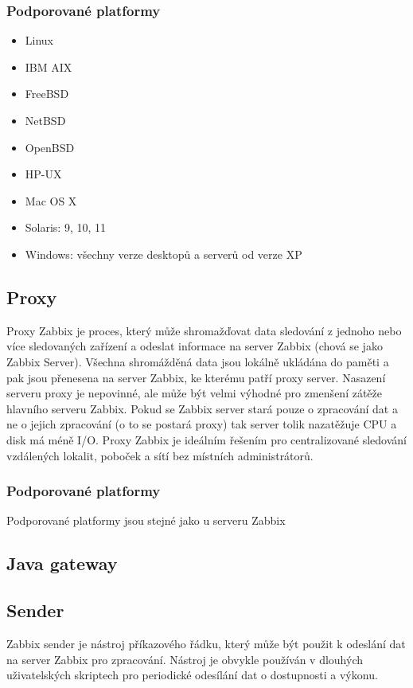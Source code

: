 \documentclass{article}
\begin{document}
\subsubsection{Podporované platformy}
\begin{itemize}
\item Linux
\item IBM AIX
\item FreeBSD
\item NetBSD
\item OpenBSD
\item HP-UX
\item Mac OS X
\item Solaris: 9, 10, 11
\item Windows: všechny verze desktopů a serverů od verze XP
\end{itemize}
\subsection{Proxy}
Proxy Zabbix je proces, který může shromažďovat data sledování z jednoho nebo více sledovaných zařízení a odeslat informace na server Zabbix (chová se jako Zabbix Server). Všechna shromážděná data jsou lokálně ukládána do paměti a pak jsou přenesena na server Zabbix, ke kterému patří proxy server.\newline
Nasazení serveru proxy je nepovinné, ale může být velmi výhodné pro zmenšení zátěže hlavního serveru Zabbix. Pokud se Zabbix server stará pouze o zpracování dat a ne o jejich zpracování (o to se postará proxy) tak server tolik nazatěžuje CPU a disk má méně I/O.\newline
Proxy Zabbix je ideálním řešením pro centralizované sledování vzdálených lokalit, poboček a sítí bez místních administrátorů.
\subsubsection{Podporované platformy}
Podporované platformy jsou stejné jako u serveru Zabbix
\subsection{Java gateway}

\subsection{Sender}
Zabbix sender je nástroj příkazového řádku, který může být použit k odeslání dat na server Zabbix pro zpracování.\newline
Nástroj je obvykle používán v dlouhých uživatelských skriptech pro periodické odesílání dat o dostupnosti a výkonu.
\end{document}
